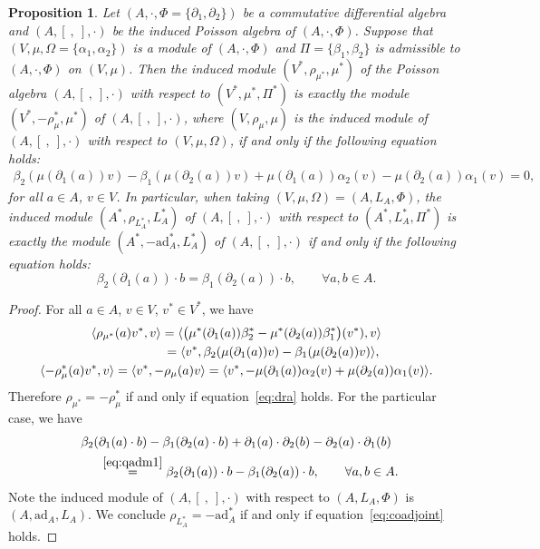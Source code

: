 \documentclass[10pt,a4paper]{amsart}
\numberwithin{equation}{section}
\newtheorem{Proposition}[Theorem]{Proposition}
{ \theoremstyle{definition}
	\newtheorem{Definition}[Theorem]{Definition}
	\newtheorem{Note}[Theorem]{Note}
	\newtheorem{Example}[Theorem]{Example}
	\newtheorem{Remark}[Theorem]{Remark} }
\newcommand{\ad}{\mathrm{ad}}
\begin{document}
\begin{Proposition}\label{pro:assdualrep}
 Let $(A, \cdot, \Phi = \{\partial_1, \partial_2\})$ be a commutative differential algebra and $(A, [\ ,\ ], \cdot)$ be the induced Poisson algebra of $(A, \cdot, \Phi)$.
 Suppose that $(V, \mu, \Omega = \{\alpha_1, \alpha_2\} )$ is a module of $(A, \cdot, \Phi)$ and
 $\Pi = \{\beta_1, \beta_2\}$ is admissible to $(A, \cdot, \Phi)$ on $(V, \mu)$.
 Then the induced module $(V^*, \rho_{\mu^*}, \mu^*)$ of the Poisson algebra $(A, [\ ,\ ], \cdot)$ with respect to $(V^*, \mu^*, \Pi^*)$ is exactly the module $(V^*, -\rho^*_\mu, \mu^*)$ of $(A, [\ ,\ ], \cdot)$,
 where $(V, \rho_\mu, \mu)$ is the induced module of $(A, [\ ,\ ], \cdot)$ with respect to $(V, \mu, \Omega)$,
 if and only if the following equation holds:
 \begin{gather}
 \beta_2(\mu(\partial_1(a))v) - \beta_1(\mu(\partial_2(a))v) + \mu(\partial_1(a))\alpha_2(v) - \mu(\partial_2(a))\alpha_1(v) = 0, \label{eq:dra}
 \end{gather}
for all $a \in A$, $v \in V$. In particular, when taking $(V, \mu, \Omega) = (A, L_A, \Phi)$,
 the induced module $(A^*, \rho_{L_A^*},\allowbreak L_A^*)$ of $(A, [\ ,\ ], \cdot)$ with respect to $(A^*, L_A^*, \Pi^*)$
 is exactly the module $(A^*, -\ad_A^*, L_A^*)$ of $(A, [\ ,\ ], \cdot)$
 if and only if the following equation holds:
 \begin{equation}
 \beta_2(\partial_1(a)) \cdot b = \beta_1(\partial_2(a)) \cdot b, \qquad \forall a, b \in A. \label{eq:coadjoint}
 \end{equation}
\end{Proposition}
\begin{proof}
 For all $a \in A$, $v \in V$, $v^* \in V^*$, we have
 \begin{gather*}
\langle \rho_{\mu^*}(a) v^*, v \rangle = \langle \big(\mu^*(\partial_1(a)) \beta_2^* - \mu^*(\partial_2(a)) \beta_1^*\big)(v^*), v \rangle \\
\hphantom{\langle \rho_{\mu^*}(a) v^*, v \rangle}{}
= \langle v^*, \beta_2(\mu(\partial_1(a))v) - \beta_1(\mu(\partial_2(a))v)\rangle, \\
\langle -\rho^*_{\mu}(a) v^*, v \rangle = \langle v^*, -\rho_{\mu}(a) v \rangle = \langle v^*, -\mu(\partial_1(a))\alpha_2(v) + \mu(\partial_2(a))\alpha_1(v) \rangle.
 \end{gather*}
 Therefore $\rho_{\mu^*} = -\rho^*_{\mu}$ if and only if equation~\eqref{eq:dra} holds.
 For the particular case, we have
 \begin{gather*}
 \beta_2(\partial_1(a) \cdot b) - \beta_1(\partial_2(a) \cdot b) + \partial_1(a) \cdot \partial_2(b) - \partial_2(a) \cdot \partial_1(b)\\
 \qquad{} \overset{\eqref{eq:qadm1}}{=} \beta_2(\partial_1(a)) \cdot b - \beta_1(\partial_2(a)) \cdot b, \qquad \forall a,b \in A.
 \end{gather*}
 Note the induced module of $(A, [\ ,\ ], \cdot)$ with respect to $(A, L_A, \Phi)$ is $(A, \ad_A, L_A)$.
 We conclude $\rho_{L_A^*} = -\ad_A^*$ if and only if equation~\eqref{eq:coadjoint} holds.
\end{proof}
\end{document}
